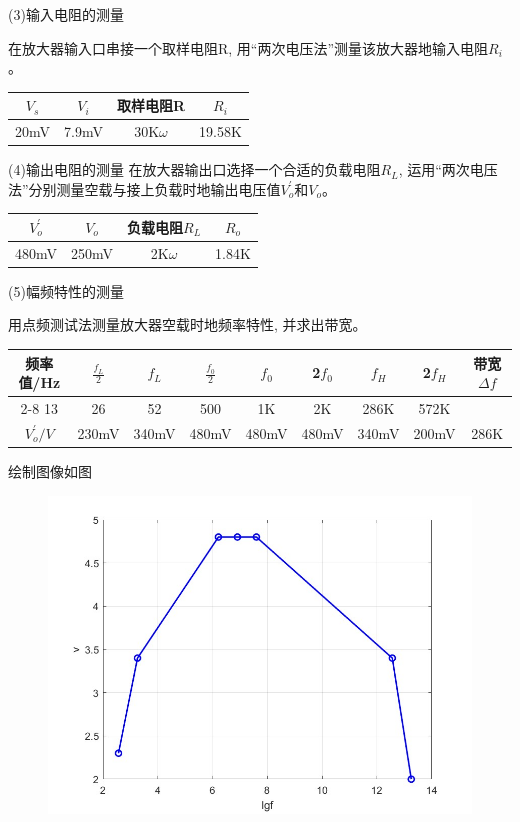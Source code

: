 \documentclass[10pt, a4paper]{article} %
\begin{document}
(3)输入电阻的测量

在放大器输入口串接一个取样电阻R, 用“两次电压法”测量该放大器地输入电阻$R_i$。
\begin{table}[ht]
    \centering
    \label{tab:c}
    \begin{tabular}{c|c|c|c}
        \toprule
        $V_s$&$V_i$&取样电阻R&$R_i$\\
        \midrule
        20mV&7.9mV&30K$\omega$&19.58K\\ 
        \bottomrule
    \end{tabular}
\end{table}

\newpage

(4)输出电阻的测量
在放大器输出口选择一个合适的负载电阻$R_L$, 运用“两次电压法”分别测量空载与接上负载时地输出电压值$V_{o}^{'}$和$V_o$。

\begin{table}[ht]
    \centering
    \label{tab:d}
    \begin{tabular}{c|c|c|c}
        \toprule
        $V_{o}^{'}$&$V_o$&负载电阻$R_L$&$R_o$\\
        \midrule
        480mV&250mV&2K$\omega$&1.84K\\ 
        \bottomrule
    \end{tabular}
\end{table}

(5)幅频特性的测量

用点频测试法测量放大器空载时地频率特性, 并求出带宽。

\begin{table}[ht]
    \centering
    \label{tab:e}
    \begin{tabular}{c|c|c|c|c|c|c|c|c}
        \toprule
        \multirow{2}{*}{频率值/Hz}&$\frac{f_L}{2}$&$f_L$&$\frac{f_0}{2}$&$f_0$&2$f_0$&$f_H$&2$f_H$&\multirow{2}{*}{带宽$\Delta f$}\\
        \cline{2-8}
        13&26&52&500&1K&2K&286K&572K\\
        \midrule 
        $V_o^{\prime}/V$&230mV&340mV&480mV&480mV&480mV&340mV&200mV&286K\\
        \bottomrule
    \end{tabular}
\end{table}

绘制图像如图

\begin{figure}[ht]
    \centering
    \includegraphics[width=0.7\linewidth]{image/1.jpg}
    \label{fig:side:h}
\end{figure}
\end{document}
